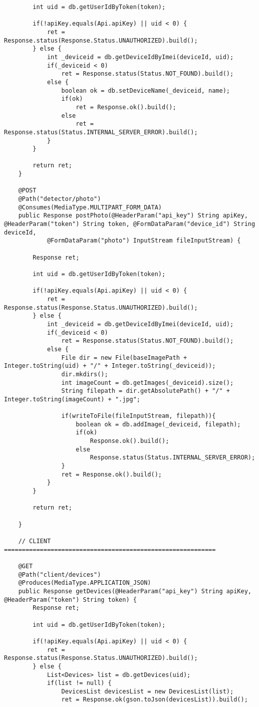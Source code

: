 \begin{lstlisting}
		int uid = db.getUserIdByToken(token);
		
		if(!apiKey.equals(Api.apiKey) || uid < 0) {
			ret = Response.status(Response.Status.UNAUTHORIZED).build();
		} else {
			int _deviceid = db.getDeviceIdByImei(deviceId, uid);
			if(_deviceid < 0)
				ret = Response.status(Status.NOT_FOUND).build();
			else {
				boolean ok = db.setDeviceName(_deviceid, name);
				if(ok)
					ret = Response.ok().build();
				else
					ret = Response.status(Status.INTERNAL_SERVER_ERROR).build();
			}
		}
		
		return ret;
	}
	
	@POST
	@Path("detector/photo")
	@Consumes(MediaType.MULTIPART_FORM_DATA)
	public Response postPhoto(@HeaderParam("api_key") String apiKey, @HeaderParam("token") String token, @FormDataParam("device_id") String deviceId,
			@FormDataParam("photo") InputStream fileInputStream) {
		
		Response ret;
		
		int uid = db.getUserIdByToken(token);
		
		if(!apiKey.equals(Api.apiKey) || uid < 0) {
			ret = Response.status(Response.Status.UNAUTHORIZED).build();
		} else {
			int _deviceid = db.getDeviceIdByImei(deviceId, uid);
			if(_deviceid < 0)
				ret = Response.status(Status.NOT_FOUND).build();
			else {
				File dir = new File(baseImagePath + Integer.toString(uid) + "/" + Integer.toString(_deviceid));
				dir.mkdirs();
				int imageCount = db.getImages(_deviceid).size();
				String filepath = dir.getAbsolutePath() + "/" + Integer.toString(imageCount) + ".jpg";
				
				if(writeToFile(fileInputStream, filepath)){
					boolean ok = db.addImage(_deviceid, filepath);
					if(ok)
						Response.ok().build();
					else
						Response.status(Status.INTERNAL_SERVER_ERROR);
				}
				ret = Response.ok().build();
			}
		}
		
		return ret;
		
	}
	
	// CLIENT ===========================================================
	
	@GET
	@Path("client/devices")
	@Produces(MediaType.APPLICATION_JSON)
	public Response getDevices(@HeaderParam("api_key") String apiKey, @HeaderParam("token") String token) {
		Response ret;
		
		int uid = db.getUserIdByToken(token);
		
		if(!apiKey.equals(Api.apiKey) || uid < 0) {
			ret = Response.status(Response.Status.UNAUTHORIZED).build();
		} else {
			List<Devices> list = db.getDevices(uid);
			if(list != null) {
				DevicesList devicesList = new DevicesList(list);
				ret = Response.ok(gson.toJson(devicesList)).build();
				

\end{lstlisting}
